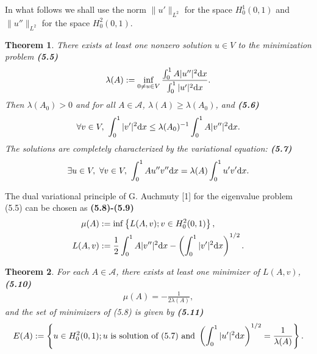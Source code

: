 \documentclass{book}
\numberwithin{equation}{section}
\newtheorem{theorem}{Theorem}[section]
\begin{document}
\begin{enumerate}
    In what follows we shall use the norm $\|u'\|_{L^2}$ for the space $H_0^1(0,1)$ and $\|u''\|_{L^2}$ for the space $H_0^2(0,1)$.
    
    \begin{theorem}
        There exists at least one nonzero solution $u\in V$ to the minimization problem \textbf{(5.5)}
        \begin{align*}
            \lambda(A) := \inf_{0\ne u\in V} \frac{\int_0^1 A|u''|^2{\rm d}x}{\int_0^1 |u'|^2{\rm d}x}.
        \end{align*}
        Then $\lambda(A_0) > 0$ and for all $A\in\mathcal{A}$, $\lambda(A)\ge\lambda(A_0)$, and \textbf{(5.6)}
        \begin{align*}
            \forall v\in V,\ \int_0^1 |v'|^2{\rm d}x\le\lambda(A_0)^{-1}\int_0^1 A|v''|^2{\rm d}x.
        \end{align*}
        The solutions are completely characterized by the variational equation: \textbf{(5.7)}
        \begin{align*}
            \exists u\in V,\ \forall v\in V,\ \int_0^1 Au''v''{\rm d}x = \lambda(A)\int_0^1 u'v'{\rm d}x.
        \end{align*}
    \end{theorem}
    The dual variational principle of G. Auchmuty [1] for the eigenvalue problem (5.5) can be chosen as \textbf{(5.8)-(5.9)}
    \begin{align*}
        \mu(A) &:= \inf\left\{L(A,v);v\in H_0^2(0,1)\right\},\\
        L(A,v) &:= \frac{1}{2}\int_0^1 A|v''|^2{\rm d}x - \left(\int_0^1 |v'|^2{\rm d}x\right)^{1/2}.
    \end{align*}
    
    \begin{theorem}
        For each $A\in\mathcal{A}$, there exists at least one minimizer of $L(A,v)$, \textbf{(5.10)}
        \begin{align*}
            \mu(A) = -\frac{1}{2\lambda(A)},
        \end{align*}
        and the set of minimizers of (5.8) is given by \textbf{(5.11)}
        \begin{align*}
            E(A) := \left\{u\in H_0^2(0,1);u \mbox{ is solution of (5.7) and } \left(\int_0^1 |u'|^2{\rm d}x\right)^{1/2} = \frac{1}{\lambda(A)}\right\}.
        \end{align*}
    \end{theorem}


\end{enumerate}
\end{document}
